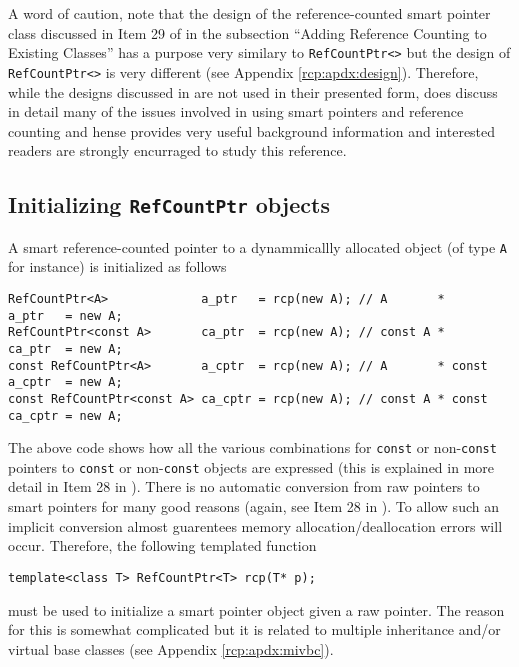 A word of caution, note that the design of the reference-counted smart
pointer class discussed in Item 29 of {}\cite{ref:meyers_1996} in the
subsection ``Adding Reference Counting to Existing Classes'' has a
purpose very similary to {}\texttt{RefCountPtr<>} but the design of
{}\texttt{RefCountPtr<>} is very different (see Appendix
{}\ref{rcp:apdx:design}).  Therefore, while the designs discussed in
{}\cite{ref:meyers_1996} are not used in their presented form,
{}\cite{ref:meyers_1996} does discuss in detail many of the issues
involved in using smart pointers and reference counting and hense
provides very useful background information and interested readers are
strongly encurraged to study this reference.

%
\subsection{Initializing {}\texttt{RefCountPtr} objects}
\label{rcp:sec:init-rcp-objects}
%

A smart reference-counted pointer to a dynammicallly allocated object
(of type {}\texttt{A} for instance) is initialized as follows

{\scriptsize\begin{verbatim}
RefCountPtr<A>             a_ptr   = rcp(new A); // A       *       a_ptr   = new A;
RefCountPtr<const A>       ca_ptr  = rcp(new A); // const A *       ca_ptr  = new A;
const RefCountPtr<A>       a_cptr  = rcp(new A); // A       * const a_cptr  = new A;
const RefCountPtr<const A> ca_cptr = rcp(new A); // const A * const ca_cptr = new A;
\end{verbatim}}

The above code shows how all the various combinations for
{}\texttt{const} or non-{}\texttt{const} pointers to {}\texttt{const}
or non-{}\texttt{const} objects are expressed (this is explained in
more detail in Item 28 in {}\cite{ref:meyers_1996}).  There is no
automatic conversion from raw pointers to smart pointers for many good
reasons (again, see Item 28 in {}\cite{ref:meyers_1996}).  To allow such
an implicit conversion almost guarentees memory
allocation/deallocation errors will occur.  Therefore, the following
templated function

{\scriptsize\begin{verbatim}
template<class T> RefCountPtr<T> rcp(T* p);
\end{verbatim}}

{}\noindent{}must be used to initialize a smart pointer object given a
raw pointer.  The reason for this is somewhat complicated but it is
related to multiple inheritance and/or virtual base classes (see
Appendix {}\ref{rcp:apdx:mivbc}).


